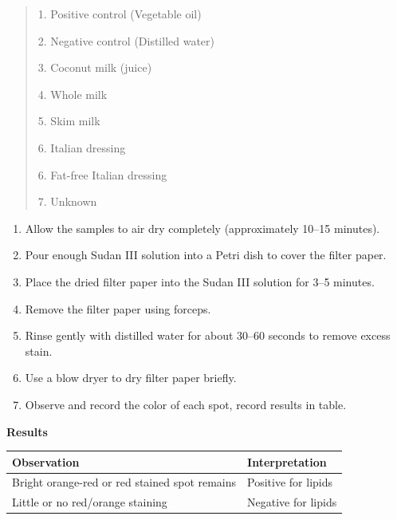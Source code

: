 \documentclass[
  letterpaper,
  DIV=11,
  numbers=noendperiod]{scrreprt}
\newcounter{none} %
\begin{document}
\begin{quote}
1. Positive control (Vegetable oil)

2. Negative control (Distilled water)

3. Coconut milk (juice)

4. Whole milk

5. Skim milk

6. Italian dressing

6. Fat-free Italian dressing

7. Unknown
\end{quote}

\begin{enumerate}
\def\labelenumi{\arabic{enumi}.}
\setcounter{enumi}{4}
\item
  Allow the samples to air dry completely (approximately 10--15
  minutes).
\item
  Pour enough Sudan III solution into a Petri dish to cover the filter
  paper.
\item
  Place the dried filter paper into the Sudan III solution for 3--5
  minutes.
\item
  Remove the filter paper using forceps.
\item
  Rinse gently with distilled water for about 30--60 seconds to remove
  excess stain.
\item
  Use a blow dryer to dry filter paper briefly.
\item
  Observe and record the color of each spot, record results in table.
\end{enumerate}

\textbf{Results}

{\def\LTcaptype{none} %
\begin{longtable}[]{@{}
  >{\raggedright\arraybackslash}p{}
  >{\raggedright\arraybackslash}p{}@{}}
\toprule\noalign{}
\begin{minipage}[b]{\linewidth}\raggedright
\textbf{Observation}
\end{minipage} & \begin{minipage}[b]{\linewidth}\raggedright
\textbf{Interpretation}
\end{minipage} \\
\midrule\noalign{}
\endhead
\bottomrule\noalign{}
\endlastfoot
Bright orange-red or red stained spot remains & Positive for lipids \\
Little or no red/orange staining & Negative for lipids \\
\end{longtable}
}
\end{document}
